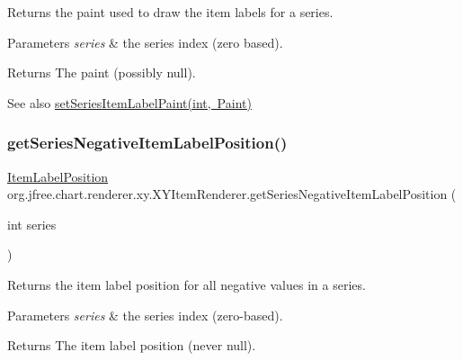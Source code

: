 Returns the paint used to draw the item labels for a series.


\begin{DoxyParams}{Parameters}
{\em series} & the series index (zero based).\\
\hline
\end{DoxyParams}
\begin{DoxyReturn}{Returns}
The paint (possibly {\ttfamily null}).
\end{DoxyReturn}
\begin{DoxySeeAlso}{See also}
\mbox{\hyperlink{interfaceorg_1_1jfree_1_1chart_1_1renderer_1_1xy_1_1_x_y_item_renderer_a83e3bce5da4ac920d662099c995252a4}{set\+Series\+Item\+Label\+Paint(int, Paint)}} 
\end{DoxySeeAlso}
\mbox{\label{interfaceorg_1_1jfree_1_1chart_1_1renderer_1_1xy_1_1_x_y_item_renderer_a0f0aff12d691d7b3715e2d1f461d1441}} 
\subsubsection{\texorpdfstring{get\+Series\+Negative\+Item\+Label\+Position()}{getSeriesNegativeItemLabelPosition()}}
{\footnotesize\ttfamily \mbox{\hyperlink{classorg_1_1jfree_1_1chart_1_1labels_1_1_item_label_position}{Item\+Label\+Position}} org.\+jfree.\+chart.\+renderer.\+xy.\+X\+Y\+Item\+Renderer.\+get\+Series\+Negative\+Item\+Label\+Position (\begin{DoxyParamCaption}\item[{int}]{series }\end{DoxyParamCaption})}

Returns the item label position for all negative values in a series.


\begin{DoxyParams}{Parameters}
{\em series} & the series index (zero-\/based).\\
\hline
\end{DoxyParams}
\begin{DoxyReturn}{Returns}
The item label position (never {\ttfamily null}). 
\end{DoxyReturn}
\mbox{\label{interfaceorg_1_1jfree_1_1chart_1_1renderer_1_1xy_1_1_x_y_item_renderer_a6d212ddcea5d74f8723d7caa2d62a34a}} 
